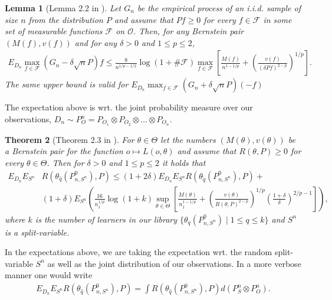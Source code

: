 \documentclass[11pt, a4paper]{article}
\newtheorem{theorem}{Theorem}
\newtheorem{lemma}[theorem]{Lemma}
\theoremstyle{definition}
\theoremstyle{remark}
\newcommand{\q}{q}
\newcommand{\btheta}{\theta}
\newcommand{\Sn}{S^n}
\begin{document}
\begin{lemma}[Lemma 2.2 in \parencite{vaart06}] \label{finitesamplebound}
    Let $G_{n}$ be the empirical process of an i.i.d. sample of size $n$ from the distribution $P$ and assume that $P f \geq 0$ for every $f \in \mathcal{F}$ in some set of measurable functions $ \mathcal{F} $ on $ \mathcal{O} $. Then, for any Bernstein pair $(M(f), v(f))$ and for any $\delta>0$ and $1 \leq p \leq 2$,
    \begin{align*}
        E_{D_n} \max_{f \in \mathcal{F}}(G_n-\delta \sqrt{n} P) f \leq \frac{8}{n^{1 / p-1 / 2}} \log (1+\# \mathcal{F}) \max _{f \in \mathcal{F}}\left[\frac{M(f)}{n^{1-1 / p}}+\left(\frac{v(f)}{(\delta P f)^{2-p}}\right)^{1 / p}\right].
    \end{align*}
    The same upper bound is valid for $ E_{D_n} \max_{f \in \mathcal{F}}(G_n+\delta \sqrt{n} P)(-f) $  
\end{lemma}
The expectation above is wrt. the joint probability measure over our observations, $ D_n \sim P_{O}^{n} = P_{O_1} \otimes P_{O_2} \otimes \dots \otimes P_{O_n} $. 

\begin{theorem}[Theorem 2.3 in \parencite{vaart06}] \label{finitesample}
   For $ \btheta \in \Theta $ let the numbers $ (M(\btheta) , v(\btheta)) $ be a Bernstein pair for the function $ o \mapsto L(o, \btheta) $ and assume that $ R(\btheta, P) \geq 0 $ for every $ \btheta \in \Theta $. Then for $ \delta > 0 $ and $ 1 \leq p \leq 2 $ it holds that 
   \begin{align*}
       E_{D_n} E_{\Sn} &R(\btheta_{\hat{\q}}(P_{n, \Sn}^{0}), P) \leq(1 + 2 \delta) E_{D_n} E_{\Sn} R(\btheta_{ \tilde{\q}}(P_{n,\Sn}^{0}), P) +\\
                       &(1 + \delta) E_{\Sn} \left(  \frac{16}{n_1^{1/p}} \log (1 +k) \sup_{\btheta \in \Theta} \left[ \frac{M(\btheta)}{n_1^{1-1/p}} +  \left( \frac{v(\btheta)}{R(\btheta, P)^{2-p}} \right)^{1/p} \left( \frac{1 + \delta}{\delta} \right)^{2/p-1} \right]\right),
   \end{align*}
   where $ k $ is the number of learners in our library $ \{\btheta_{\q}(P_{n, \Sn}^{0}) \mid 1 \leq \q \leq k\} $ and $ \Sn $ is a split-variable. 
\end{theorem}
In the expectations above, we are taking the expectation wrt. the random split-variable $ \Sn $ as well as the joint distribution of our observations. In a more verbose manner one would write 
\begin{align*}
     E_{D_n} E_{\Sn}  R(\btheta_{\hat{\q}}(P_{n, \Sn}^{0}), P) = \int R(\btheta_{ \hat{q} }(P_{n, \Sn}^{0}), P) d (P_\Sn \otimes  P^{n}_O ).
\end{align*}
\end{document}
